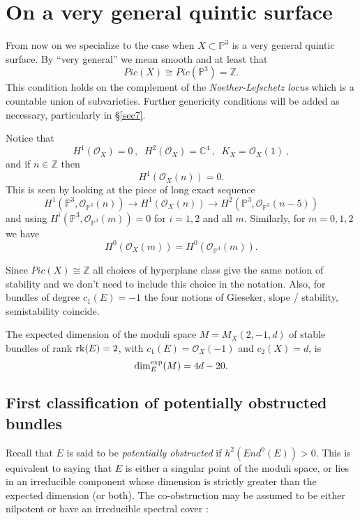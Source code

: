 \documentclass{amsart}
\theoremstyle{plain}
\numberwithin{equation}{section}
\begin{document}
\section{On a very general quintic surface}

From now on we specialize to the case when $X\subset {{\mathbb P}} ^3$ is a very general
quintic surface. By ``very general'' we mean smooth and at least that 
$$
Pic (X)\cong Pic({{\mathbb P}} ^3) = {{\mathbb Z}} .
$$
This condition holds on the complement of the {\em Noether-Lefschetz locus} which is
a countable union of subvarieties. Further genericity conditions will be added 
as necessary, particularly
in \S \ref{sec7}. 

Notice that
$$
H^1({{\mathcal O}} _X)=0\, ,\;\; H^2({{\mathcal O}} _X) = {{\mathbb C}} ^4  \, , \;\; K_X = {{\mathcal O}} _X(1)\, ,
$$
and if $n\in {{\mathbb Z}}$ then  
$$
H^1({{\mathcal O}} _X(n))=0.
$$
This is seen by looking at the piece of long exact sequence 
$$
H^1({{\mathbb P}} ^3, {{\mathcal O}} _{{{\mathbb P}} ^3}(n)) \rightarrow H^1({{\mathcal O}} _X(n))
\rightarrow H^2({{\mathbb P}} ^3, {{\mathcal O}} _{{{\mathbb P}} ^3}(n-5))
$$
and using $H^i({{\mathbb P}} ^3, {{\mathcal O}} _{{{\mathbb P}} ^3}(m))=0$ for $i=1,2$ and all $m$.
Similarly, for $m=0,1,2$ we have
$$
H^0({{\mathcal O}} _X(m))= H^0({{\mathcal O}} _{{{\mathbb P}} ^3}(m)).
$$

Since $Pic(X)\cong {{\mathbb Z}}$ all choices of hyperplane class give the same notion
of stability and we don't need to include this choice in the notation. 
Also, for bundles of degree $c_1(E)=-1$ the four notions of 
Gieseker, slope / stability, semistability coincide.

The expected dimension of the moduli space $M = M _X(2,-1, d)$ of stable bundles
of rank ${{\rm rk}} (E)=2$, with $c_1(E)={{\mathcal O}} _X(-1)$ and $c_2(X)=d$, is 
\begin{equation}
\label{ed}
\dim ^{\rm exp}_E(M ) = 4d -20.
\end{equation}

\subsection{First classification of potentially obstructed bundles}

Recall that $E$ is said to be 
{\em potentially obstructed} if $h^2(End^0(E))>0$. This is equivalent to
saying that $E$ is either a singular point of the moduli space, or lies in an
irreducible component whose dimension is strictly greater than the expected dimension (or both). The co-obstruction may be assumed to be either nilpotent or have an irreducible spectral cover \cite{Zuo} \cite{Langer}: 
\end{document}
